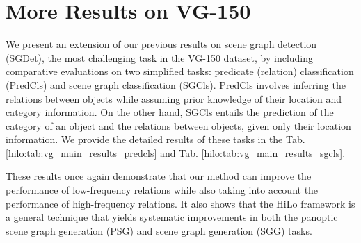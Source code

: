 \section{More Results on VG-150}
We present an extension of our previous results on scene graph detection (SGDet), the most challenging task in the VG-150 \citep{krishna2017visual} dataset, by including comparative evaluations on two simplified tasks: predicate (relation) classification (PredCls) and scene graph classification (SGCls).
 PredCls involves inferring the relations between objects while assuming prior knowledge of their location and category information.
 On the other hand, SGCls entails the prediction of the category of an object and the relations between objects, given only their location information.
 We provide the detailed results of these tasks in the Tab. \ref{hilo:tab:vg_main_results_predcls} and Tab. \ref{hilo:tab:vg_main_results_sgcls}.

 These results once again demonstrate that our method can improve the performance of low-frequency relations while also taking into account the performance of high-frequency relations.
It also shows that the HiLo framework is a general technique that yields systematic improvements in both the panoptic scene graph generation (PSG) and scene graph generation (SGG) tasks.

